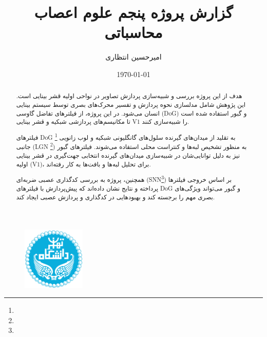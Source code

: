 \documentclass{report}
\title{گزارش پروژه پنجم علوم اعصاب محاسباتی}
\author{امیرحسین انتظاری}
\date{\today}
\begin{document}
\begin{figure}
    \centering \includegraphics[height=3cm]{images/Logo.png}
\end{figure}
\renewcommand{\chaptername}{بخش}
\newpage
\maketitle
\newpage
\tableofcontents

    \begin{abstract}
        هدف از این پروژه بررسی و شبیه‌سازی پردازش تصاویر در نواحی اولیه قشر بینایی است. این پژوهش شامل مدلسازی نحوه پردازش و تفسیر محرک‌های بصری توسط سیستم بینایی انسان می‌شود. در این پروژه، از فیلترهای تفاضل گاوسی 
        (DoG) 
        و گبور استفاده شده است تا مکانیسم‌های پردازشی شبکیه و قشر بینایی 
        V1 
        را شبیه‌سازی کنند.

        فیلترهای 
        DoG \footnote{}
        به تقلید از میدان‌های گیرنده سلول‌های گانگلیونی شبکیه و لوب زانویی جانبی 
        (LGN \footnote{}) 
        به منظور تشخیص لبه‌ها و کنتراست محلی استفاده می‌شوند. فیلترهای گبور نیز به دلیل توانایی‌شان در شبیه‌سازی میدان‌های گیرنده انتخابی جهت‌گیری در قشر بینایی اولیه (V1)، 
        برای تحلیل لبه‌ها و بافت‌ها به کار رفته‌اند.
        
        همچنین، پروژه به بررسی کدگذاری عصبی ضربه‌ای 
        (SNN\footnote{}) 
        بر اساس خروجی فیلترها پرداخته و نتایج نشان داده‌اند که پیش‌پردازش با فیلترهای DoG و گبور می‌تواند ویژگی‌های بصری مهم را برجسته کند و بهبود‌هایی در کدگذاری و پردازش عصبی ایجاد کند.
        \end{abstract}
\restoregeometry


\newpage

\newpage
% 


\end{document}
